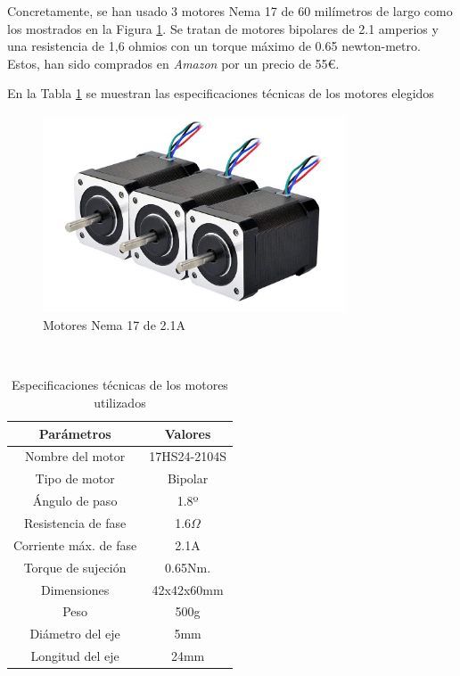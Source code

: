Concretamente, se han usado 3 motores Nema 17 de 60 milímetros de largo como los mostrados en la Figura \ref{fig:nema17_60}. Se tratan de
motores bipolares de 2.1 amperios y una resistencia de 1,6 ohmios con un torque máximo de 0.65 newton-metro. Estos, han sido comprados 
en \textit{Amazon} por un precio de 55\euro. 

En la Tabla \ref{cuadro:nema17_60} 
se muestran las especificaciones técnicas de los motores elegidos
\begin{figure} [h!]
    \begin{center}
      \includegraphics[width=9cm]{figs/nema17.jpg}
    \end{center}
    \caption{Motores Nema 17 de 2.1A}
    \label{fig:nema17_60}
  \end{figure}\ 

\begin{table}[H]
\begin{center}
\begin{tabular}{|c|c|}
\hline
\textbf{Parámetros} & \textbf{Valores} \\
\hline
Nombre del motor & 17HS24-2104S \\
Tipo de motor & Bipolar \\
Ángulo de paso & 1.8º \\
Resistencia de fase & 1.6$\Omega$ \\
Corriente máx. de fase & 2.1A \\
Torque de sujeción & 0.65Nm. \\
Dimensiones & 42x42x60mm \\
Peso & 500g \\
Diámetro del eje & 5mm \\
Longitud del eje & 24mm \\
\hline
\end{tabular}
\caption{Especificaciones técnicas de los motores utilizados}
\label{cuadro:nema17_60}
\end{center}
\end{table}

